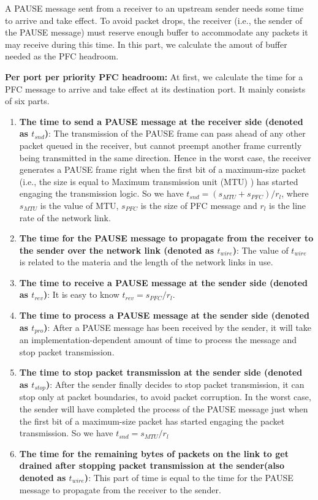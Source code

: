 
A PAUSE message sent from a receiver to an upstream sender needs some time to arrive and take effect. To avoid packet drops, the receiver (i.e., the sender of the PAUSE message) must reserve enough buffer to accommodate any packets it may receive during this time. In this part, we calculate the amout of buffer needed as the PFC headroom.

\textbf{Per port per priority PFC headroom:} At first, we calculate the time for a PFC message to arrive and take effect at its destination port. It mainly consists of six parts.

\begin{enumerate}
	
\item\textbf{The time to send a PAUSE message at the receiver side (denoted as $t_{snd}$)}: The transmission of the PAUSE frame  can pass ahead of any other packet queued in the receiver, but cannot preempt another frame currently being transmitted in the same direction. Hence in the worst case, the receiver generates a PAUSE frame right when the first bit of a maximum-size packet (i.e., the size is equal to Maximum transmission unit (MTU) ) has started engaging the transmission logic. So we have  $t_{snd}=(s_{MTU}+s_{PFC})/r_{l}$, where $s_{MTU}$ is the value of MTU, $s_{PFC}$ is the size of PFC message and $r_{l}$ is the line rate of the network link.

\item\textbf{The time for the PAUSE message to propagate from the receiver to the sender over the network link (denoted as $t_{wire}$)}: The value of  $t_{wire}$ is related to the materia and the length of the network links in use.

\item\textbf{The time to receive a PAUSE message at the sender side (denoted as $t_{rev}$)}: It is easy to know $t_{rev}=s_{PFC}/r_{l}$.

\item\textbf{The time to process a PAUSE message at the sender side (denoted as $t_{pro}$)}:  After a PAUSE message has been received by the sender, it will take an implementation-dependent amount of time to process the message and stop packet transmission.

\item\textbf{The time to stop packet transmission at the sender side (denoted as $t_{stop}$)}: After the sender finally decides to stop packet transmission, it can stop only at packet boundaries, to avoid packet corruption.  In the worst case, the sender will have completed the process of the PAUSE message just when the first bit of a maximum-size packet has started engaging the packet transmission. So we have  $t_{snd}=s_{MTU}/r_{l}$

\item\textbf{The time for the remaining bytes of packets on the link to get drained after stopping packet transmission at the sender(also denoted as $t_{wire}$)}: This part of time is equal to the time for the PAUSE message to propagate from the receiver to the sender.
\end{enumerate}

